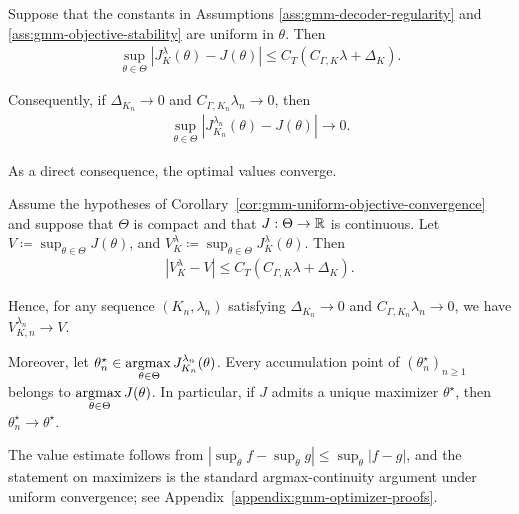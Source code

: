 \begin{corollary}
    \label{cor:gmm-uniform-objective-convergence} Suppose that the constants in Assumptions \ref{ass:gmm-decoder-regularity} and \ref{ass:gmm-objective-stability} are uniform in $\theta$. Then
    \begin{align}
        \sup_{\theta\in\Theta} \left| J_K^\lambda(\theta) - J(\theta) \right| \leq C_T \left( C_{\Gamma,K}\lambda + \Delta_K \right).
        \label{eq:gmm-uniform-objective-bound}
    \end{align}

    Consequently, if $\Delta_{K_n}\to0$ and $C_{\Gamma,K_n}\lambda_n\to0$, then
    \begin{align}
        \sup_{\theta\in\Theta} \left| J_{K_n}^{\lambda_n}(\theta) - J(\theta) \right| \longrightarrow0.
        \label{eq:gmm-uniform-objective-convergence}
    \end{align}
\end{corollary}

As a direct consequence, the optimal values converge.

\begin{corollary}
    \label{cor:gmm-optimal-policy-convergence}
    Assume the hypotheses of Corollary~\ref{cor:gmm-uniform-objective-convergence} and suppose that $\Theta$ is compact and that $J:\Theta\to\mathbb{R}$ is continuous. Let $V \coloneqq \sup_{\theta\in\Theta} J(\theta)$, and $V_K^\lambda \coloneqq \sup_{\theta\in\Theta} J_K^\lambda(\theta)$. Then
    \begin{align}
        \left| V_K^\lambda-V \right| \leq C_T \left( C_{\Gamma,K}\lambda+\Delta_K \right).
        \label{eq:gmm-optimal-value-bound}
    \end{align}

    Hence, for any sequence $(K_n,\lambda_n)$ satisfying $\Delta_{K_n}\to0$ and $C_{\Gamma,K_n}\lambda_n\to0$, we have $V_{K,n}^{\lambda_n}\to V$.

    Moreover, let $\theta_n^\star\in\argmax_{\theta\in\Theta}J_{K_n}^{\lambda_n}(\theta)$. Every accumulation point of $(\theta_n^\star)_{n\geq1}$ belongs to $\argmax_{\theta\in\Theta}J(\theta)$. In particular, if $J$ admits a unique maximizer $\theta^\star$, then $\theta_n^\star \longrightarrow \theta^\star$.
\end{corollary}

The value estimate follows from $|\sup_\theta f-\sup_\theta g|\leq\sup_\theta|f-g|$, and the statement on maximizers is the standard argmax-continuity argument under uniform convergence; see Appendix~\ref{appendix:gmm-optimizer-proofs}.

